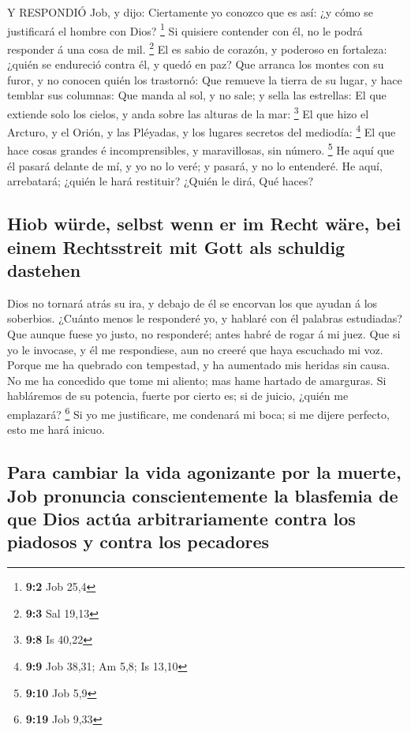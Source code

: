  Y RESPONDIÓ Job, y dijo:  Ciertamente yo
conozco que es así: ¿y cómo se justificará el hombre con Dios?
\footnote{\textbf{9:2} Job 25,4}  Si quisiere contender con
él, no le podrá responder á una cosa de mil. \footnote{\textbf{9:3} Sal
  19,13}  El es sabio de corazón, y poderoso en fortaleza:
¿quién se endureció contra él, y quedó en paz?  Que arranca
los montes con su furor, y no conocen quién los trastornó: 
Que remueve la tierra de su lugar, y hace temblar sus columnas:
 Que manda al sol, y no sale; y sella las estrellas:
 El que extiende solo los cielos, y anda sobre las alturas
de la mar: \footnote{\textbf{9:8} Is 40,22}  El que hizo el
Arcturo, y el Orión, y las Pléyadas, y los lugares secretos del
mediodía: \footnote{\textbf{9:9} Job 38,31; Am 5,8; Is 13,10}
 El que hace cosas grandes é incomprensibles, y
maravillosas, sin número. \footnote{\textbf{9:10} Job 5,9} 
He aquí que él pasará delante de mí, y yo no lo veré; y pasará, y no lo
entenderé.  He aquí, arrebatará; ¿quién le hará restituir?
¿Quién le dirá, Qué haces?

\hypertarget{hiob-wuxfcrde-selbst-wenn-er-im-recht-wuxe4re-bei-einem-rechtsstreit-mit-gott-als-schuldig-dastehen}{%
\subsection{Hiob würde, selbst wenn er im Recht wäre, bei einem
Rechtsstreit mit Gott als schuldig
dastehen}\label{hiob-wuxfcrde-selbst-wenn-er-im-recht-wuxe4re-bei-einem-rechtsstreit-mit-gott-als-schuldig-dastehen}}

 Dios no tornará atrás su ira, y debajo de él se encorvan
los que ayudan á los soberbios.  ¿Cuánto menos le
responderé yo, y hablaré con él palabras estudiadas?  Que
aunque fuese yo justo, no responderé; antes habré de rogar á mi juez.
 Que si yo le invocase, y él me respondiese, aun no creeré
que haya escuchado mi voz.  Porque me ha quebrado con
tempestad, y ha aumentado mis heridas sin causa.  No me ha
concedido que tome mi aliento; mas hame hartado de amarguras.
 Si habláremos de su potencia, fuerte por cierto es; si de
juicio, ¿quién me emplazará? \footnote{\textbf{9:19} Job 9,33}
 Si yo me justificare, me condenará mi boca; si me dijere
perfecto, esto me hará inicuo.

\hypertarget{para-cambiar-la-vida-agonizante-por-la-muerte-job-pronuncia-conscientemente-la-blasfemia-de-que-dios-actuxfaa-arbitrariamente-contra-los-piadosos-y-contra-los-pecadores}{%
\subsection{Para cambiar la vida agonizante por la muerte, Job pronuncia
conscientemente la blasfemia de que Dios actúa arbitrariamente contra
los piadosos y contra los
pecadores}\label{para-cambiar-la-vida-agonizante-por-la-muerte-job-pronuncia-conscientemente-la-blasfemia-de-que-dios-actuxfaa-arbitrariamente-contra-los-piadosos-y-contra-los-pecadores}}

